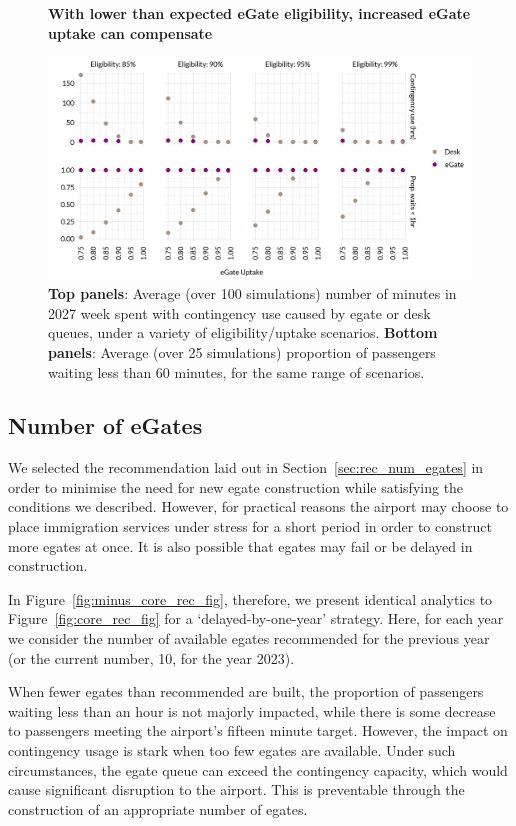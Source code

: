 \documentclass[10pt]{article}
\newcommand*{\figuretitle}[1]{%
    {\centering%
    \textbf{#1}%
    \par\medskip}%
}
\begin{document}
\begin{figure}[!ht]
    \centering
    \figuretitle{With lower than expected eGate eligibility, increased eGate uptake can compensate}
    \includegraphics[width=\textwidth]{figures/robustness_fig.png}
     \caption{\textbf{Top panels}: Average (over 100 simulations) number of minutes in 2027 week spent with contingency use caused by \gls{egate} or desk queues, under a variety of eligibility/uptake scenarios. \textbf{Bottom panels}: Average (over 25 simulations) proportion of passengers waiting less than 60 minutes, for the same range of scenarios.} \label{fig:robustness_fig}
\end{figure}

\subsection{Number of eGates}
We selected the recommendation laid out in Section~\ref{sec:rec_num_egates} in order to minimise the need for new \gls{egate} construction while satisfying the conditions we described. However, for practical reasons the airport may choose to place immigration services under stress for a short period in order to construct more \glspl{egate} at once. It is also possible that \glspl{egate} may fail or be delayed in construction. 

In Figure~\ref{fig:minus_core_rec_fig}, therefore, we present identical analytics to Figure~\ref{fig:core_rec_fig} for a `delayed-by-one-year' strategy. Here, for each year we consider the number of available \glspl{egate} recommended for the previous year (or the current number, 10, for the year 2023).

 When fewer \glspl{egate} than recommended are built, the proportion of passengers waiting less than an hour is not majorly impacted, while there is some decrease to passengers meeting the airport's fifteen minute target.  However, the impact on contingency usage is stark when too few \glspl{egate} are available. Under such circumstances, the \gls{egate} queue can exceed the contingency capacity, which would cause significant disruption to the airport. This is preventable through the construction of an appropriate number of \glspl{egate}.
\end{document}
